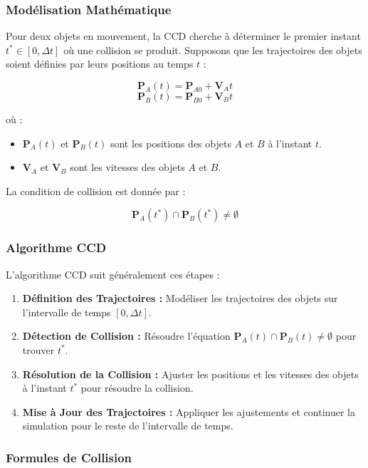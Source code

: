 \subsubsection{Modélisation Mathématique}

Pour deux objets en mouvement, la CCD cherche à déterminer le premier instant \( t^* \in [0, \Delta t] \) où une collision se produit. Supposons que les trajectoires des objets soient définies par leurs positions au temps \( t \) :

\[
\mathbf{P}_A(t) = \mathbf{P}_{A0} + \mathbf{V}_A t
\]
\[
\mathbf{P}_B(t) = \mathbf{P}_{B0} + \mathbf{V}_B t
\]

où :
\begin{itemize}
    \item \( \mathbf{P}_A(t) \) et \( \mathbf{P}_B(t) \) sont les positions des objets \( A \) et \( B \) à l'instant \( t \).
    \item \( \mathbf{V}_A \) et \( \mathbf{V}_B \) sont les vitesses des objets \( A \) et \( B \).
\end{itemize}

La condition de collision est donnée par :

\[
\mathbf{P}_A(t^*) \cap \mathbf{P}_B(t^*) \neq \emptyset
\]

\subsubsection{Algorithme CCD}

L'algorithme CCD suit généralement ces étapes :
\begin{enumerate}
    \item \textbf{Définition des Trajectoires :} Modéliser les trajectoires des objets sur l'intervalle de temps \( [0, \Delta t] \).
    \item \textbf{Détection de Collision :} Résoudre l'équation \( \mathbf{P}_A(t) \cap \mathbf{P}_B(t) \neq \emptyset \) pour trouver \( t^* \).
    \item \textbf{Résolution de la Collision :} Ajuster les positions et les vitesses des objets à l'instant \( t^* \) pour résoudre la collision.
    \item \textbf{Mise à Jour des Trajectoires :} Appliquer les ajustements et continuer la simulation pour le reste de l'intervalle de temps.
\end{enumerate}

\subsubsection{Formules de Collision}

